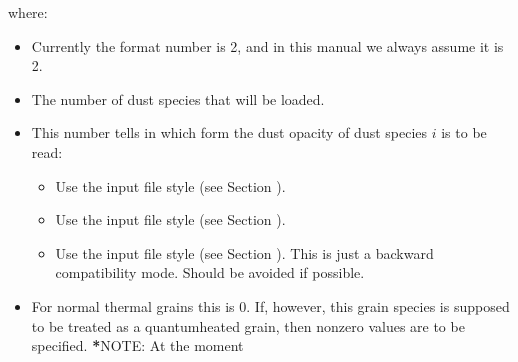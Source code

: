 \documentclass[letterpaper,10pt,english]{sphinxmanual}
\begin{document}
where:
\begin{itemize}
\item {} 
 Currently the format number is 2, and in this manual
we always assume it is 2.

\item {} 
 The number of dust species that will be loaded.

\item {} 
 This number tells in which form the dust
opacity of dust species \(i\) is to be read:
\begin{itemize}
\item {} 
 Use the  input file
style (see Section {\hyperref[\detokenize{inputoutputfiles:sec-dustkappa-files}]{}}).

\item {} 
 Use the  input
file style (see Section {\hyperref[\detokenize{inputoutputfiles:sec-dustkapscatmat-files}]{}}).

\item {} 
 Use the  input file
style (see Section {\hyperref[\detokenize{inputoutputfiles:sec-dustopac-oldstyle}]{}}). This is just a backward
compatibility mode. Should be avoided if possible.

\end{itemize}

\item {} 
 For normal thermal grains this is 0. If,
however, this grain species is supposed to be treated as a quantum\sphinxhyphen{}heated
grain, then non\sphinxhyphen{}zero values are to be specified. {\color{red}\bfseries{}*}NOTE: At the moment
\begin{quote}


\end{quote}
\end{itemize}
\end{document}
